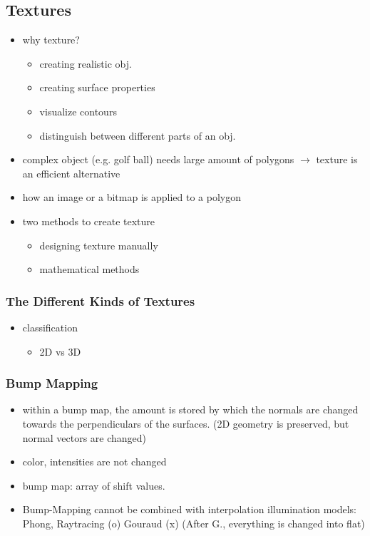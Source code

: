 \documentclass{standalone}
\begin{document}
\subsection{Textures}

\begin{itemize}
	\item why texture? 
		\begin{itemize}
			\item creating realistic obj.
			\item creating surface properties
			\item visualize contours
			\item distinguish between different parts of an obj.
		\end{itemize}
	\item complex object (e.g. golf ball) needs large amount of polygons $\rightarrow$ texture is an efficient alternative
	\item how an image or a bitmap is applied to a polygon
	\item two methods to create texture
		\begin{itemize}
			\item designing texture manually
			\item mathematical methods
		\end{itemize}
\end{itemize}

\subsubsection{The Different Kinds of Textures}

\begin{itemize}
	\item classification 
		\begin{itemize}
			\item 2D vs 3D
		\end{itemize}
\end{itemize}

\subsubsection*{Bump Mapping}

\begin{itemize}
	\item within a bump map, the amount is stored by which the normals are changed towards the perpendiculars of the surfaces. (2D geometry is preserved, but normal vectors are changed)
	\item color, intensities are not changed
	\item bump map: array of shift values. 
	\item Bump-Mapping cannot be combined with interpolation illumination models: Phong, Raytracing (o) Gouraud (x) (After G., everything is changed into flat)
\end{itemize}
\end{document}
